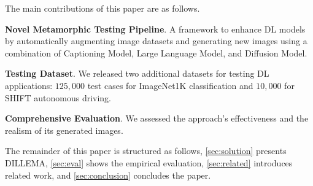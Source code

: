 The main contributions of this paper are as follows.

\noindent\textbf{Novel Metamorphic Testing Pipeline}.
    A framework to enhance DL models by automatically augmenting image datasets and generating new images using a combination of Captioning Model, Large Language Model, and Diffusion Model.
    
\noindent\textbf{Testing Dataset}.
    We released two additional datasets for testing DL applications: $125,000$ test cases for ImageNet1K classification and $10,000$ for SHIFT autonomous driving.
    
\noindent\textbf{Comprehensive Evaluation}.
    We assessed the approach's effectiveness and the realism of its generated images.

The remainder of this paper is structured as follows, \autoref{sec:solution} presents DILLEMA, \autoref{sec:eval} shows the empirical evaluation, \autoref{sec:related} introduces related work, and \autoref{sec:conclusion} concludes the paper.
